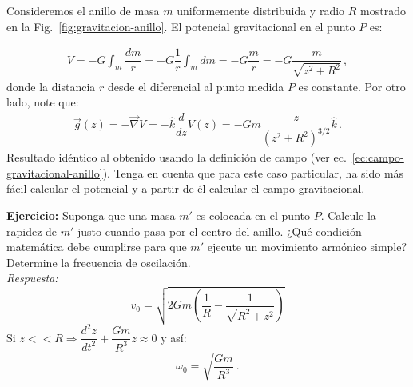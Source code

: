 Consideremos el anillo de masa $m$ uniformemente distribuida y radio $R$ mostrado en la Fig.~\ref{fig:gravitacion-anillo}. El potencial gravitacional en el punto $P$ es:

\begin{eqnarray}
V=-G\int_m \dfrac{dm}{r}=-G \dfrac{1}{r}\int_m dm =-G \dfrac{m}{r}=-G \dfrac{m}{\sqrt{z^2+R^2}}\,,
\label{ec:potencial-gravitacinal-anillo}
\end{eqnarray}
donde la distancia $r$ desde el diferencial al punto medida $P$ es constante.
Por otro lado, note que:
\begin{eqnarray}
\vec{g}(z)=-\vec{\nabla}V=-\hat{k}\dfrac{d}{dz}V(z)=-Gm \dfrac{z}{(z^2+R^2)^{3/2}} \hat{k}\,.
\end{eqnarray}
Resultado idéntico al obtenido usando la definición de campo (ver ec.~\ref{ec:campo-gravitacional-anillo}). Tenga en cuenta que para este caso particular, ha sido más fácil calcular el potencial y a partir de él calcular el campo gravitacional. 

\textbf{Ejercicio:} Suponga que una masa $m'$ es colocada en el punto $P$. Calcule la rapidez de $m'$ justo cuando pasa por el centro del anillo. ¿Qué condición matemática debe cumplirse para que $m'$ ejecute un movimiento armónico simple? Determine la frecuencia de oscilación.\\
\textit{Respuesta:} 
\begin{displaymath}
v_0=\sqrt{2Gm( \dfrac{1}{R}-\dfrac{1}{\sqrt{R^2+z^2} } )}
\end{displaymath}
Si $z<<R \Rightarrow \dfrac{d^2z}{dt^2}+ \dfrac{Gm}{R^3} z \approx 0$ y así:
\begin{displaymath}
\omega_0=\sqrt{\dfrac{Gm}{R^3} }\,.
\end{displaymath} 



